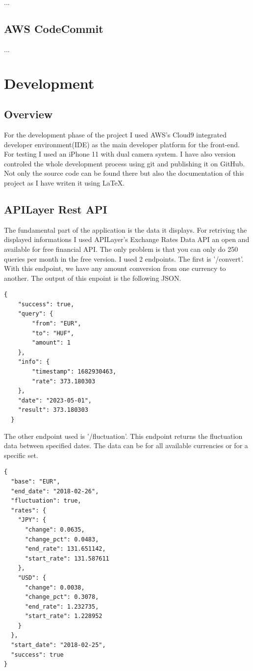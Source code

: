 \documentclass[11pt,a4paper,oneside]{report}
\begin{document}
...

\section{AWS CodeCommit}

...


\chapter{Development}

\section{Overview}
For the development phase of the project I used AWS's Cloud9 integrated developer environment(IDE) as the main developer platform for the front-end. For testing I used an iPhone 11 with dual camera system.
I have also version controled the whole development process using git and publishing it on GitHub. Not only the source code can be found there but also the documentation of this project as I have writen it using \LaTeX{}.

\section{APILayer Rest API}

The fundamental part of the application is the data it displays. For retriving the displayed informations I used APILayer's Exchange Rates Data API an open and available for free financial API.  The only problem is that you can only do 250 queries per month in the free version. I used 2 endpoints. The first is '/convert'. With this endpoint, we have any amount conversion from one currency to another. The output of this enpoint is the following JSON.

\begin{lstlisting}[frame=single,float=!ht,caption=JSON from /convert endpoint, label=listing:Bibtex]
  {
    "success": true,
    "query": {
        "from": "EUR",
        "to": "HUF",
        "amount": 1
    },
    "info": {
        "timestamp": 1682930463,
        "rate": 373.180303
    },
    "date": "2023-05-01",
    "result": 373.180303
  }
\end{lstlisting}

The other endpoint used is '/fluctuation'. This endpoint returns the fluctuation data between specified dates. The data can be for all available currencies or for a specific set.
\begin{lstlisting}[frame=single,float=!ht,caption=JSON from /fluctuation endpoint, label=listing:Bibtex]
{
  "base": "EUR",
  "end_date": "2018-02-26",
  "fluctuation": true,
  "rates": {
    "JPY": {
      "change": 0.0635,
      "change_pct": 0.0483,
      "end_rate": 131.651142,
      "start_rate": 131.587611
    },
    "USD": {
      "change": 0.0038,
      "change_pct": 0.3078,
      "end_rate": 1.232735,
      "start_rate": 1.228952
    }
  },
  "start_date": "2018-02-25",
  "success": true
}
\end{lstlisting}
\end{document}
